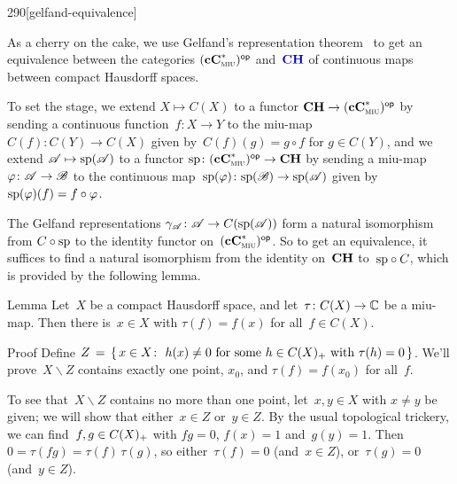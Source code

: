\begin{parsec}{290}[gelfand-equivalence]%
\begin{point}{10}%
As a cherry on the cake,
we use Gelfand's representation theorem~
to get an equivalence between the categories ${(\mathbf{cC}^*_{\text{\textsc{miu}}})}{^{\mathsf{op}}}$
and~$\Define{\CH}$%
of continuous maps between compact Hausdorff spaces.

To set the stage,
we extend $X\mapsto C(X)$ to a functor
$\mathbf{CH}\to {(\mathbf{cC}^*_{\text{\textsc{miu}}})}{^{\mathsf{op}}}$
by sending a continuous function~$f\colon X\to Y$
to the miu-map $C(f)\colon C(Y)\to C(X)$
given by~$C(f)(g)=g\circ f$ for $g\in C(Y)$,
and we extend $\mathscr{A}\mapsto \mathrm{sp}(\mathscr{A})$
to a functor $\mathrm{sp}\colon {(\mathbf{cC}^*_{\text{\textsc{miu}}})}{^{\mathsf{op}}}\to \mathbf{CH}$
by sending a miu-map $\varphi \colon \mathscr{A}\to\mathscr{B}$
to the continuous map~$\mathrm{sp}(\varphi)\colon \mathrm{sp}(\mathscr{B})\to\mathrm{sp}(\mathscr{A})$
given by~$\mathrm{sp}(\varphi)(f)=f\circ \varphi$.

The Gelfand representations $\gamma_{\mathscr{A}}\colon \mathscr{A}\to C(\mathrm{sp}(\mathscr{A}))$
form a natural isomorphism
from $C\circ \mathrm{sp}$ to the identity functor on~${(\mathbf{cC}^*_{\text{\textsc{miu}}})}{^{\mathsf{op}}}$.
So to get an equivalence,
it suffices to find a natural isomorphism
from the identity on~$\mathbf{CH}$ to~$\mathrm{sp}\circ C$,
which is provided by the following lemma.
\end{point}
\begin{point}{20}{Lemma}%
Let~$X$ be a compact Hausdorff space,
and let~$\tau \colon C(X)\to \mathbb{C}$ be a miu-map.
Then there is~$x\in X$ with $\tau(f)=f (x)$
for all~$f\in C(X)$.
\begin{point}{30}{Proof}%
Define
$Z\,= \, \{\,x\in X\colon \ h(x)\neq 0\text{ for some~$h\in C(X)_{+}$
with $\tau(h)=0$}\,\}$.
We'll prove~$X\backslash Z$ contains
exactly one point, $x_0$, and $\tau(f)=f(x_0)$ for all~$f$.
\begin{point}{40}%
To see that~$X\backslash Z$ contains no more than one point,
let~$x,y\in X$ with $x\neq y$ be given;
we will show that either~$x\in Z$ or~$y\in Z$.
By the usual topological trickery,
we can find~$f,g\in C(X)_{+}$
with $fg=0$, $f(x)=1$ and~$g(y)=1$.
Then~$0=\tau(fg)=\tau(f)\,\tau(g)$,
so either~$\tau(f)=0$ (and~$x\in Z$), or~$\tau(g)=0$
(and~$y\in Z$).


\end{point}
\end{point}
\end{point}
\end{parsec}
